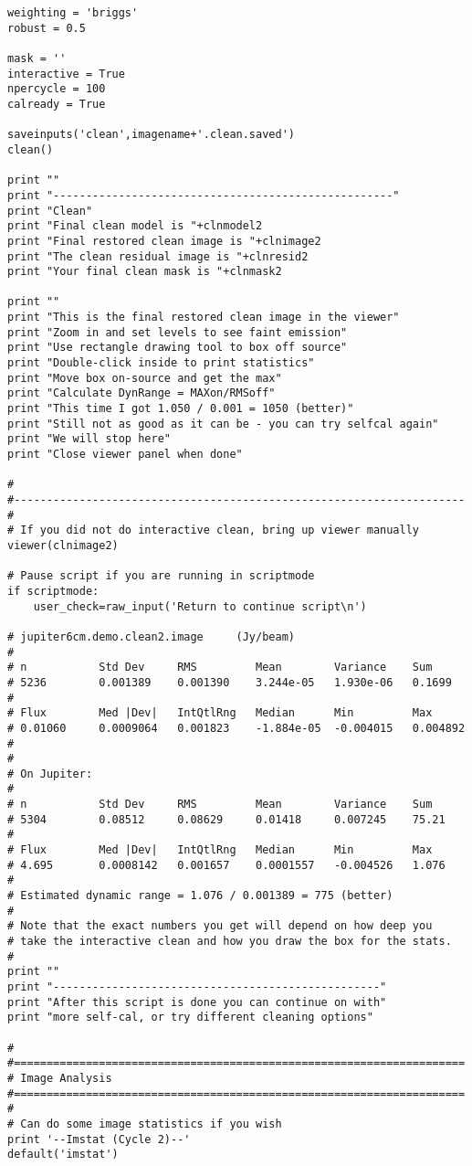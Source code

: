 \begin{verbatim}
weighting = 'briggs'
robust = 0.5

mask = ''
interactive = True
npercycle = 100
calready = True

saveinputs('clean',imagename+'.clean.saved')
clean()

print ""
print "----------------------------------------------------"
print "Clean"
print "Final clean model is "+clnmodel2
print "Final restored clean image is "+clnimage2
print "The clean residual image is "+clnresid2
print "Your final clean mask is "+clnmask2

print ""
print "This is the final restored clean image in the viewer"
print "Zoom in and set levels to see faint emission"
print "Use rectangle drawing tool to box off source"
print "Double-click inside to print statistics"
print "Move box on-source and get the max"
print "Calculate DynRange = MAXon/RMSoff"
print "This time I got 1.050 / 0.001 = 1050 (better)"
print "Still not as good as it can be - you can try selfcal again"
print "We will stop here"
print "Close viewer panel when done"

#
#---------------------------------------------------------------------
#
# If you did not do interactive clean, bring up viewer manually
viewer(clnimage2)

# Pause script if you are running in scriptmode
if scriptmode:
    user_check=raw_input('Return to continue script\n')

# jupiter6cm.demo.clean2.image     (Jy/beam)
# 
# n           Std Dev     RMS         Mean        Variance    Sum
# 5236        0.001389    0.001390    3.244e-05   1.930e-06   0.1699    
# 
# Flux        Med |Dev|   IntQtlRng   Median      Min         Max
# 0.01060     0.0009064   0.001823    -1.884e-05  -0.004015   0.004892  
# 
# 
# On Jupiter:
# 
# n           Std Dev     RMS         Mean        Variance    Sum
# 5304        0.08512     0.08629     0.01418     0.007245    75.21     
# 
# Flux        Med |Dev|   IntQtlRng   Median      Min         Max
# 4.695       0.0008142   0.001657    0.0001557   -0.004526   1.076     
#
# Estimated dynamic range = 1.076 / 0.001389 = 775 (better)
#
# Note that the exact numbers you get will depend on how deep you
# take the interactive clean and how you draw the box for the stats.
#
print ""
print "--------------------------------------------------"
print "After this script is done you can continue on with"
print "more self-cal, or try different cleaning options"

#
#=====================================================================
# Image Analysis
#=====================================================================
#
# Can do some image statistics if you wish
print '--Imstat (Cycle 2)--'
default('imstat')


\end{verbatim}
